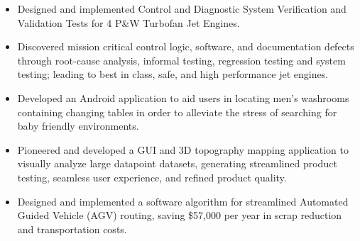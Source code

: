 \documentclass[11pt,a4paper,sans]{moderncv} %
\begin{document}

{
\begin{itemize}
	\item Designed and implemented Control and Diagnostic System Verification and Validation Tests for 4 P\&W Turbofan Jet Engines. 
	\item Discovered mission critical control logic, software, and documentation defects through root-cause analysis, informal testing, regression testing and system testing; leading to best in class, safe, and high performance jet engines.
\end{itemize}
}


{
\begin{itemize}
	\item Developed an Android application to aid users in locating men's washrooms containing changing tables in order to alleviate the stress of searching for baby friendly environments.
\end{itemize}
}

{
\begin{itemize}
	\item Pioneered and developed a GUI and 3D topography mapping application to visually analyze large datapoint datasets, generating streamlined product testing, seamless user experience, and refined product quality.
\end{itemize}
}

{
\begin{itemize}
	\item Designed and implemented a software algorithm for streamlined Automated Guided Vehicle (AGV) routing, saving \$57,000 per year in scrap reduction and transportation costs.
\end{itemize}
}

\end{document}
